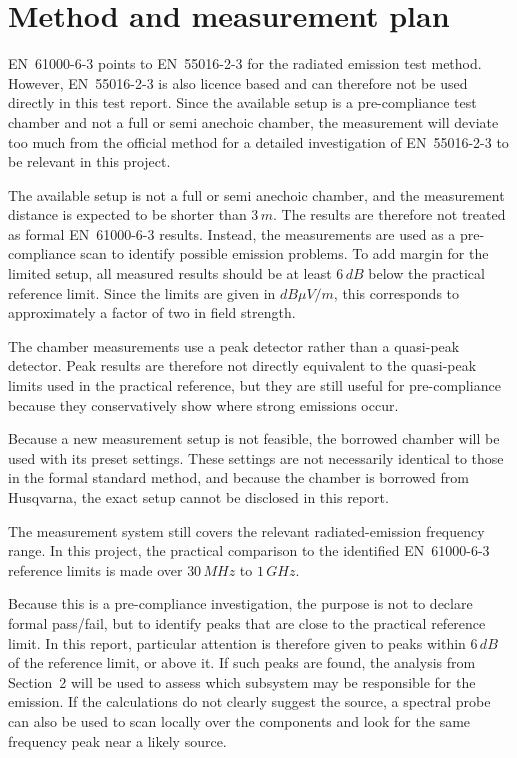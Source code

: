 \section{Method and measurement plan}

EN~61000-6-3 points to EN~55016-2-3 for the radiated emission test method.
However, EN~55016-2-3 is also licence based and can therefore not be used directly in
this test report. Since the available setup is a pre-compliance test chamber and not a full
or semi anechoic chamber, the measurement will deviate too much from the official method
for a detailed investigation of EN~55016-2-3 to be relevant in this project.

The available setup is not a full or semi anechoic chamber, and the measurement distance
is expected to be shorter than \(3\,m\). The results are therefore not treated as formal
EN~61000-6-3 results. Instead, the measurements are used as a pre-compliance scan to
identify possible emission problems. To add margin for the limited setup, all measured
results should be at least \(6\,dB\) below the practical reference limit. Since the limits are
given in \(dB\mu V/m\), this corresponds to approximately a factor of two in field strength.

The chamber measurements use a peak detector rather than a quasi-peak detector. Peak
results are therefore not directly equivalent to the quasi-peak limits used in the practical
reference, but they are still useful for pre-compliance because they conservatively show
where strong emissions occur.

Because a new measurement setup is not feasible, the borrowed chamber will be used
with its preset settings. These settings are not necessarily identical to those in the formal
standard method, and because the chamber is borrowed from Husqvarna, the exact setup
cannot be disclosed in this report.

The measurement system still covers the relevant radiated-emission frequency range. In
this project, the practical comparison to the identified EN~61000-6-3 reference limits is
made over \(30\,MHz\) to \(1\,GHz\).

Because this is a pre-compliance investigation, the purpose is not to declare formal
pass/fail, but to identify peaks that are close to the practical reference limit. In this
report, particular attention is therefore given to peaks within \(6\,dB\) of the reference
limit, or above it. If such peaks are found, the analysis from Section~2 will be used to
assess which subsystem may be responsible for the emission. If the calculations do not
clearly suggest the source, a spectral probe can also be used to scan locally over the
components and look for the same frequency peak near a likely source.

